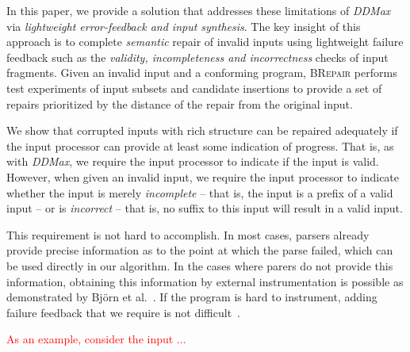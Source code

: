 \documentclass[sigconf,review,anonymous]{acmart}
\newcounter{todocounter}
\newcommand{\todo}[1]{\marginpar{$|$}\textcolor{red}{\stepcounter{todocounter}\footnote[\thetodocounter]{\textcolor{red}{\textbf{TODO }}\textit{#1}}}}
\newcommand{\recheck}[1]{\textcolor{red}{#1}}
\renewcommand{\todo}[1]{}
\newcommand{\approach}{\textsc{BRepair}\xspace}
\newcommand{\ddmax}{\textit{DDMax}\xspace}
\begin{document}
In this paper, we provide a solution that addresses these limitations of \ddmax via \textit{lightweight error-feedback and input synthesis}. The key insight of this approach is to complete \textit{semantic} repair of invalid inputs using lightweight failure feedback such as the \textit{validity, incompleteness and incorrectness} checks of input fragments. Given an invalid input and a conforming program, \approach performs test experiments of input subsets and candidate insertions to provide a set of repairs prioritized by the distance of the repair from the original input.
\todo{what else is the main ingredient or key insight of the approach}

\todo{to Move/restructure}
We show that corrupted inputs with rich structure can be repaired adequately if
the input processor can provide at least some indication of progress.
That is, as with \ddmax, we require the input processor to indicate if the input
is valid.  However, when given an invalid input, we require the input processor
to indicate whether the input is merely \emph{incomplete} -- that is, the input
is a prefix of a valid input -- or is \emph{incorrect} -- that is, no suffix to
this input will result in a valid input. 

This requirement is not hard to accomplish. In most cases, parsers already
provide precise information as to the point at which the parse failed, which
can be used directly in our algorithm. In the cases where parers do not provide
this information, obtaining this information by external instrumentation is
possible as demonstrated by Bj\"orn et al.~\cite{mathis2019parser}. If
the program is hard to instrument, adding failure feedback that we require is
not difficult~\todo{
The arxiv link is~\cite{gopinath2020fuzzing} but we can't cite it because
bFuzzer is getting submitted at FSE too. -> alright, we can cite it after if accepted}.

\recheck{As an example, consider the input ... }
\end{document}

